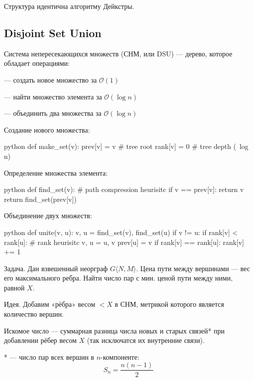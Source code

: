 Структура идентична {\ital алгоритму Дейкстры}.

\subsection{Disjoint Set Union}

{\bold Система непересекающихся множеств} {\ital (СНМ, или DSU)} --- дерево, которое обладает операциями:
\begin{list*}
\item{} --- создать новое множество за $\mathcal{O}(1)$
\item{} --- найти множество элемента за $\mathcal{O}(\log n)$
\item{} --- объединить два множества за $\mathcal{O}(\log n)$
\end{list*}

{\bold Создание} нового множества:
\begin{code}{python}
def make_set(v):
  prev[v] = v # tree root
  rank[v] = 0 # tree depth (~log n)
\end{code}
{\bold Определение} множества элемента:
\begin{code}{python}
def find_set(v): # path compression heurisitc
  if v == prev[v]:
    return v
  return find_set(prev[v])
\end{code}
{\bold Объединение} двух множеств:
\begin{code}{python}
def unite(v, u):
  v, u = find_set(v), find_set(u)
  if v != u:
    if rank[v] < rank[u]: # rank heurisitc
      v, u = u, v
    prev[u] = v
    if rank[v] == rank[u]:
      rank[v] += 1
\end{code}

\begin{theorem}
{\bold Задача.} Дан взвешенный неорграф $G\langle N, M\rangle$. Цена пути между вершинами --- вес его максимального ребра. Найти число пар с мин. ценой пути между ними, равной $X$.
\end{theorem}

{\bold Идея.} Добавим «рёбра» весом $\less X$ в СНМ, метрикой которого является {\ital количество вершин}.

Искомое число --- суммарная {\ital разница} числа новых и старых связей* при добавлении рёбер весом $X$ {\ital (так исключатся их внутренние связи)}.

* --- число пар всех вершин в $n$-компоненте:
$$S_n=\frac{n(n-1)}{2}$$

